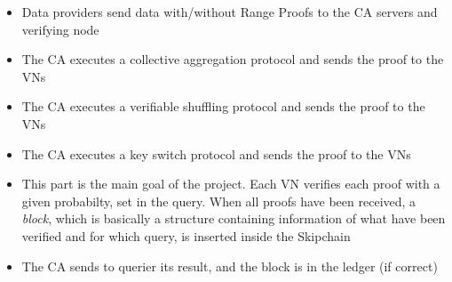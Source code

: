 \documentclass{article}
\begin{document}
\begin{itemize}
\item{Data providers send data with/without Range Proofs to the CA servers and verifying node}
\item{The CA executes a collective aggregation protocol and sends the proof to the VNs}
\item{The CA executes a verifiable shuffling protocol and sends the proof to the VNs}
\item{The CA executes a key switch protocol and sends the proof to the VNs}
\item{This part is the main goal of the project. Each VN verifies each proof with a given probabilty, set in the query. When all proofs have been received, a \textit{block}, which is basically a structure containing information of what have been verified and for which query, is inserted inside the Skipchain}
\item{The CA sends to querier its result, and the block is in the ledger (if correct)}
\end{itemize}
\end{document}
